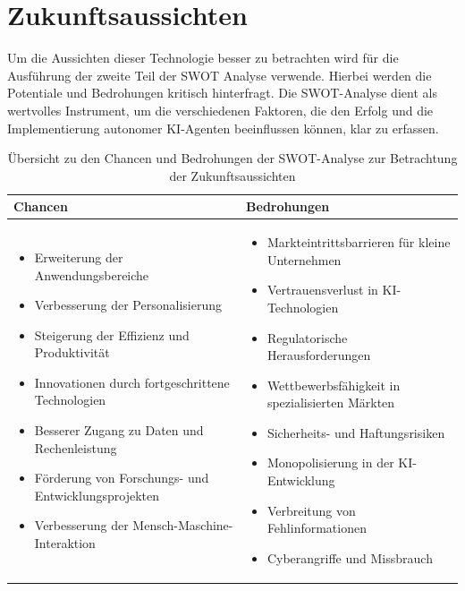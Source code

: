 \documentclass[conference]{IEEEtran}
\begin{document}
 
\section{Zukunftsaussichten}
Um die Aussichten dieser Technologie besser zu betrachten wird für die Ausführung der zweite Teil der SWOT Analyse verwende.  Hierbei werden die Potentiale und Bedrohungen kritisch hinterfragt.  Die SWOT-Analyse dient  als wertvolles Instrument, um die verschiedenen Faktoren, die den Erfolg und die Implementierung autonomer KI-Agenten beeinflussen können, klar zu erfassen. 
\begin{table}[h!]
    \centering
    \begin{tabularx}{\textwidth}{|>{\raggedright\arraybackslash}X|>{\raggedright\arraybackslash}X|} \hline 
        \textbf{Chancen} &
        \textbf{Bedrohungen} \\ \hline
        \begin{itemize}
            \item Erweiterung der Anwendungsbereiche
            \item Verbesserung der Personalisierung
            \item Steigerung der Effizienz und Produktivität
            \item Innovationen durch fortgeschrittene Technologien
            \item Besserer Zugang zu Daten und Rechenleistung
            \item Förderung von Forschungs- und Entwicklungsprojekten
            \item Verbesserung der Mensch-Maschine-Interaktion
        \end{itemize} &
        \begin{itemize}
            \item Markteintrittsbarrieren für kleine Unternehmen
            \item Vertrauensverlust in KI-Technologien
            \item Regulatorische Herausforderungen
            \item Wettbewerbsfähigkeit in spezialisierten Märkten
            \item Sicherheits- und Haftungsrisiken
            \item Monopolisierung in der KI-Entwicklung
            \item Verbreitung von Fehlinformationen
            \item Cyberangriffe und Missbrauch
        \end{itemize} \\ \hline
    \end{tabularx}
    \caption{Übersicht zu den Chancen und Bedrohungen der SWOT-Analyse zur Betrachtung der Zukunftsaussichten}
\end{table}
\end{document}
